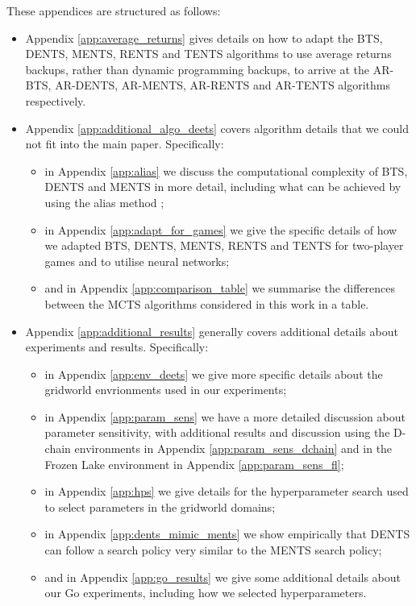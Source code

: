 \documentclass{article}
\theoremstyle{plain}
\begin{document}
\begin{appendices}
These appendices are structured as follows:
\begin{itemize}
	\item Appendix \ref{app:average_returns} gives details on how to adapt the BTS, DENTS, MENTS, RENTS and TENTS algorithms to use average returns backups, rather than dynamic programming backups, to arrive at the AR-BTS, AR-DENTS, AR-MENTS, AR-RENTS and AR-TENTS algorithms respectively.
	\item Appendix \ref{app:additional_algo_deets} covers algorithm details that we could not fit into the main paper. Specifically:
	\begin{itemize}
		\item in Appendix \ref{app:alias} we discuss the computational complexity of BTS, DENTS and MENTS in more detail, including what can be achieved by using the alias method ;
		\item in Appendix \ref{app:adapt_for_games} we give the specific details of how we adapted BTS, DENTS, MENTS, RENTS and TENTS for two-player games and to utilise neural networks;
		\item and in Appendix \ref{app:comparison_table} we summarise the differences between the MCTS algorithms considered in this work in a table.
	\end{itemize}
	\item Appendix \ref{app:additional_results} generally covers additional details about experiments and results. Specifically:
	\begin{itemize}
		\item in Appendix \ref{app:env_deets} we give more specific details about the gridworld envrionments used in our experiments;
		\item in Appendix \ref{app:param_sens} we have a more detailed discussion about parameter sensitivity, with additional results and discussion using the D-chain environments in Appendix \ref{app:param_sens_dchain} and in the Frozen Lake environment in Appendix \ref{app:param_sens_fl};
		\item in Appendix \ref{app:hps} we give details for the hyperparameter search used to select parameters in the gridworld domains;
		\item in Appendix \ref{app:dents_mimic_ments} we show empirically that DENTS can follow a search policy very similar to the MENTS search policy;
		\item and in Appendix \ref{app:go_results} we give some additional details about our Go experiments, including how we selected hyperparameters.

\end{itemize}
\end{itemize}
\end{appendices}
\end{document}
